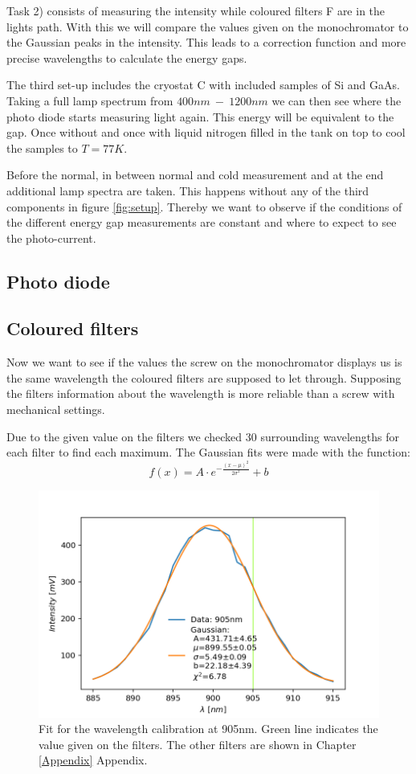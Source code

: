 \documentclass[]{article}
\begin{document}
Task 2) consists of measuring the intensity while coloured filters F are in the lights path. With this we will compare the values given on the monochromator to the Gaussian peaks in the intensity. This leads to a correction function and more precise wavelengths to calculate the energy gaps.

The third set-up includes the cryostat C with included samples of Si and GaAs. Taking a full lamp spectrum from $400nm \ - \ 1200nm$ we can then see where the photo diode starts measuring light again. This energy will be equivalent to the gap. Once without and once with liquid nitrogen filled in the tank on top to cool the samples to $T=77K$.

Before the normal, in between normal and cold measurement and at the end additional lamp spectra are taken. This happens without any of the third components in figure \ref{fig:setup}. Thereby we want to observe if the conditions of the different energy gap measurements are constant and where to expect to see the photo-current. 

\subsection{Photo diode}
\subsection{Coloured filters} \label{color filters}
Now we want to see if the values the screw on the monochromator displays us is the same wavelength the coloured filters are supposed to let through. Supposing the filters information about the wavelength is more reliable than a screw with mechanical settings.

Due to the given value on the filters we checked 30 surrounding wavelengths for each filter to find each maximum. The Gaussian fits were made with the function:
\begin{equation}
f(x) = A \cdot e^{-\frac{(x-\mu)^2}{2 \sigma^2}} + b
\end{equation}

\begin{figure}[H]
\centering
\includegraphics[width=.9\textwidth]{Plots/905nm-Filter.png}
\caption{Fit for the wavelength calibration at 905nm. Green line indicates the value given on the filters. The other filters are shown in Chapter \ref{Appendix} Appendix.}
\end{figure}
\end{document}
